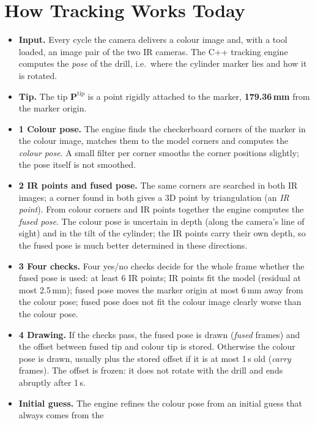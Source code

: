 \documentclass[11pt,a4paper,fleqn]{article}
\begin{document}
\section{How Tracking Works Today}
\label{sec:today}

\begin{itemize}
  \item \textbf{Input.} Every cycle the camera delivers a colour image and, with a tool loaded, an image pair of the
        two IR cameras. The C++ tracking engine computes the \emph{pose} of the drill, i.e.\ where the cylinder
        marker lies and how it is rotated.
  \item \textbf{Tip.} The tip $\mathbf{P}^{\mathrm{tip}}$ is a point rigidly attached to the marker,
        \textbf{179.36\,mm} from the marker origin.
  \item \textbf{1 Colour pose.} The engine finds the checkerboard corners of the marker in the colour image, matches
        them to the model corners and computes the \emph{colour pose}. A small filter per corner smooths the corner
        positions slightly; the pose itself is not smoothed.
  \item \textbf{2 IR points and fused pose.} The same corners are searched in both IR images; a corner found in both
        gives a 3D point by triangulation (an \emph{IR point}). From colour corners and IR points together the
        engine computes the \emph{fused pose}. The colour pose is uncertain in depth (along the camera's line of
        sight) and in the tilt of the cylinder; the IR points carry their own depth, so the fused pose is much
        better determined in these directions.
  \item \textbf{3 Four checks.} Four yes/no checks decide for the whole frame whether the fused pose is used: at
        least 6 IR points; IR points fit the model (residual at most 2.5\,mm); fused pose moves the marker origin
        at most 6\,mm away from the colour pose; fused pose does not fit the colour image clearly worse than the
        colour pose.
  \item \textbf{4 Drawing.} If the checks pass, the fused pose is drawn (\emph{fused} frames) and the offset between
        fused tip and colour tip is stored. Otherwise the colour pose is drawn, usually plus the stored offset if it
        is at most 1\,s old (\emph{carry} frames). The offset is frozen: it does not rotate with the drill and ends
        abruptly after 1\,s.
  \item \textbf{Initial guess.} The engine refines the colour pose from an initial guess that always comes from the

\end{itemize}
\end{document}

